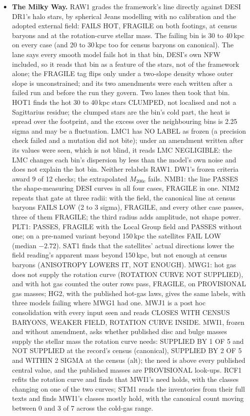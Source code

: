 \documentclass[10pt]{article}
\begin{document}
\begin{itemize}
\item \textbf{The Milky Way.} RAW1 grades the framework's line directly against DESI DR1's halo stars, by spherical Jeans modelling with no calibration and the adopted external field: FAILS HOT, FRAGILE on both footings, at census baryons and at the rotation-curve stellar mass. The failing bin is 30 to 40\,kpc on every case (and 20 to 30\,kpc too for census baryons on canonical). The lane says every smooth model fails hot in that bin, DESI's own NFW included, so it reads that bin as a feature of the stars, not of the framework alone; the FRAGILE tag flips only under a two-slope density whose outer slope is unconstrained; and its two amendments were each written after a failed run and before the run they govern. Two lanes then took that bin. HOT1 finds the hot 30 to 40\,kpc stars CLUMPED, not localised and not a Sagittarius residue; the clumped stars are the bin's cold part, the heat is spread over the footprint, and the excess over the neighbouring bins is 2.25 sigma and may be a fluctuation. LMC1 has NO LABEL as frozen (a precision check failed and a mutation did not bite); under an amendment written after its values were seen, which is not blind, it reads LMC NEGLIGIBLE: the LMC changes each bin's dispersion by less than the model's own noise and does not explain the hot bin. Neither relabels RAW1. DW1's frozen criteria award 9 of 12 checks; the extrapolated $M_{200c}$ fails. NMB1: the line PASSES the shape-measuring DESI curves in all four cases, FRAGILE in one. NIM2 repeats that gate at three radii: with the field, the canonical line at census baryons FAILS LOW (2 to 3 sigma), FRAGILE, and every other case passes, three of them FRAGILE; the third radius adds amplitude, not shape power. PLT1: PASSES, FRAGILE with the Local Group field and PASSES without one; on a pre-named variant beyond 150\,kpc the satellites FAIL LOW (median $-2.72$). SAT1 finds that the satellites' actual directions lower the field reading's apparent mass beyond 150\,kpc, but not enough at census baryons (ANISOTROPY LOWERS IT, NOT ENOUGH). MWG1: hot gas does not supply the rotation curve (ROTATION CURVE NOT SUPPLIED), and with hot gas counted the outer rows pass, FRAGILE, on PROVISIONAL gas masses; HG2, with the published hot-gas laws, gives the same labels, with three models failing where MWG1 had one. MWJ1 is a post hoc consolidation with every input seen and reads CLOSES WITH CENSUS BARYONS, WEAKER FIELD, ROTATION CURVE INSIDE. MWI1, frozen and without amendment, asks whether published disc and bulge masses supply the stellar mass the rotation curve needs: SUPPLIED BY 1 OF 5 and NOT SUPPLIED at the record's census (canonical), SUPPLIED BY 2 OF 5 and WITHIN 2 SIGMA at the census (alt); the need is above every published central value, and the published masses are PROVISIONAL look-ups. RCF1 refits the rotation curve and finds that MWI1's need holds, with the classes changing on one of the two curves; STM1 reads the inventories from their full texts and finds MWI1's classes mostly hold, with the canonical count moving between 0 and 3 of 7 across the cold-gas range.


\end{itemize}
\end{document}

